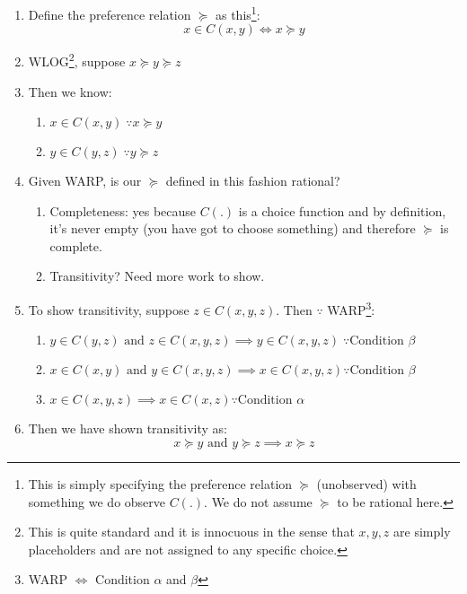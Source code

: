\documentclass{tufte-handout}
\begin{document}
\begin{enumerate}

    \item Define the preference relation $\succcurlyeq$ as this\footnote{This is simply specifying the preference relation $\succcurlyeq$ (unobserved) with something we do observe $C(.)$. We do not assume $\succcurlyeq$ to be rational here.}:
    $$x \in C(x,y) \iff x \succcurlyeq y$$
    
    \item WLOG\footnote{This is quite standard and it is innocuous in the sense that $x,y,z$ are simply placeholders and are not assigned to any specific choice.}, suppose $x \succcurlyeq y \succcurlyeq z$
    
    \item Then we know:
    \begin{enumerate}
        \item $x \in C(x,y) \; \because x \succcurlyeq y$
        \item $y \in C(y,z) \; \because y \succcurlyeq z $
    \end{enumerate}

    \item Given WARP, is our $\succcurlyeq$ defined in this fashion rational? 
    \begin{enumerate}
        \item Completeness: yes because $C(.)$ is a choice function and by definition, it's never empty (you have got to choose something) and therefore $\succcurlyeq$ is complete.
        \item Transitivity? Need more work to show.
    \end{enumerate}

    \item To show transitivity, suppose $z \in C(x, y, z)$. Then $\because$ WARP\footnote{WARP $\iff$ Condition $\alpha$ and $\beta$}:
    \begin{enumerate}
        \item $y \in C(y,z) \text{ and } z \in C(x, y, z) \implies y \in C(x, y, z) \; \because \text{Condition } \beta$
        \item $x \in C(x,y) \text{ and } y \in C(x, y, z) \implies x \in C(x, y, z) \because \text{Condition } \beta$
        \item $x \in C(x, y, z) \implies x \in C(x, z) \because \text{Condition } \alpha$
    \end{enumerate}
    
    \item Then we have shown transitivity as: $$x \succcurlyeq y \text{ and } y \succcurlyeq z \implies x \succcurlyeq z$$


\end{enumerate}
\end{document}
